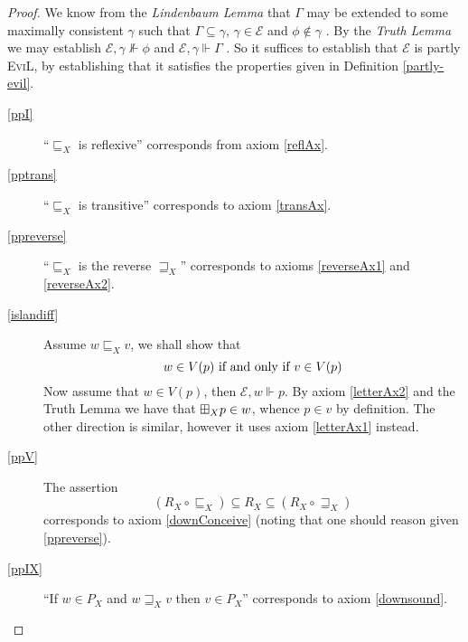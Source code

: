 \begin{proof}
We know from the \emph{Lindenbaum Lemma} that $\Gamma$ may be extended
to some maximally consistent $\gamma$ such that $\Gamma \subseteq
\gamma$, $\gamma \in \mathcal{E}$ and $\phi \nin
\gamma$ \cite[Lemma 4.17,
pg. 199]{blackburn_modal_2001}.  By the \emph{Truth Lemma} we may establish
$\mathscr{E}, \gamma \nVdash \phi$ and $\mathscr{E}, \gamma \Vdash \Gamma$ \cite[Lemma 4.21,
pgs. 201]{blackburn_modal_2001}.  So it suffices to establish
that $\mathscr{E}$ is partly \textsc{EviL}, by establishing that it
satisfies the properties given in Definition \ref{partly-evil}.

  \begin{description}
    \item[\ref{ppI}] ``$\sqsubseteq_X$ is reflexive''
      corresponds from axiom \eqref{reflAx}.
    \item[\ref{pptrans}] ``$\sqsubseteq_X$ is transitive''
      corresponds to axiom \eqref{transAx}.
    \item[\ref{ppreverse}] ``$\sqsubseteq_X$ is the
      reverse $\sqsupseteq_X$'' corresponds to axioms \eqref{reverseAx1} and
      \eqref{reverseAx2}.
    \item[\ref{islandiff}] Assume $w \sqsubseteq_X v$, we shall show
      that 
$$w \in V (p)\textup{ if and only if }v \in V (p)$$
     Now assume that $w \in V(p)$, then $\mathscr{E}, w \Vdash p$.
      By axiom \eqref{letterAx2} and the Truth Lemma we have that $\boxplus_X
      p \in w$, whence $p \in v$ by definition.  The other direction
      is similar, however it uses axiom \eqref{letterAx1} instead.
    \item[\ref{ppV}] 
The assertion
$$(R_X \circ \sqsubseteq_X) \subseteq
    R_X \subseteq (R_X \circ \sqsupseteq_X)$$
corresponds to axiom \eqref{downConceive} 
(noting that one should reason given \ref{ppreverse}). 

    \item[\ref{ppIX}] ``If $w \in P_X$ and $w \sqsupseteq_X
      v$ then $v \in P_X$'' corresponds to axiom \eqref{downsound}.


\end{description}
\end{proof}
